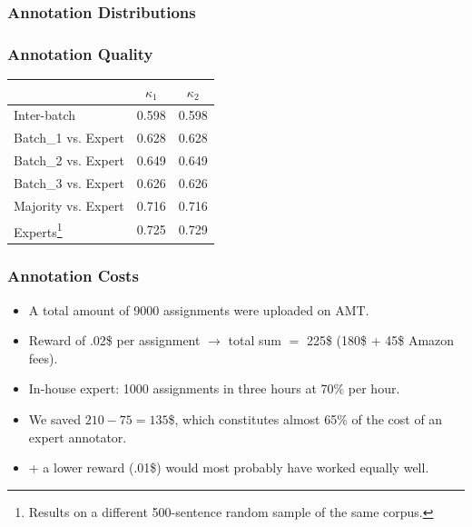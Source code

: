 \documentclass[10pt]{beamer}
\newenvironment{itemwide}%
{\begin{itemize}%
    \setlength{\itemsep}{5pt}%
    \setlength{\parskip}{5pt}}%
  {\end{itemize}}
\begin{document}
\begin{frame}
  \frametitle{Annotation Distributions}
  \begin{center}
  \end{center}
\end{frame}

\begin{frame}
  \frametitle{Annotation Quality}
\begin{center}
\begin{tabular}{|l|c|c|}
\hline
& $\kappa_{1}$ & $\kappa_{2}$ \\ 
\hline
Inter-batch & 0.598 & 0.598 \\ \hline
Batch\_1 vs. Expert & 0.628 & 0.628\\
Batch\_2 vs. Expert & 0.649 & 0.649\\
Batch\_3 vs. Expert & 0.626 & 0.626\\ \hline
Majority vs. Expert & 0.716 & 0.716\\ \hline
Experts\footnote{Results on a different 500-sentence random sample of the same corpus.} & 0.725 & 0.729\\ \hline
\end{tabular}
\end{center}
\end{frame}

\begin{frame}
  \frametitle{Annotation Costs}
\begin{itemwide}
 \item A total amount of 9000 assignments were uploaded on AMT.
 \item Reward of .02\$ per assignment $\rightarrow$ total sum $=$ 225\$ (180\$ + 45\$ Amazon fees).
 \item In-house expert: 1000 assignments in three hours at 70\% per hour.
 \item We saved $210 - 75 = 135$\$, which constitutes almost 65\% of the cost of an expert annotator.
 \item + a lower reward (.01\$) would most probably have worked equally well.
\end{itemwide}

\end{frame}
\end{document}
